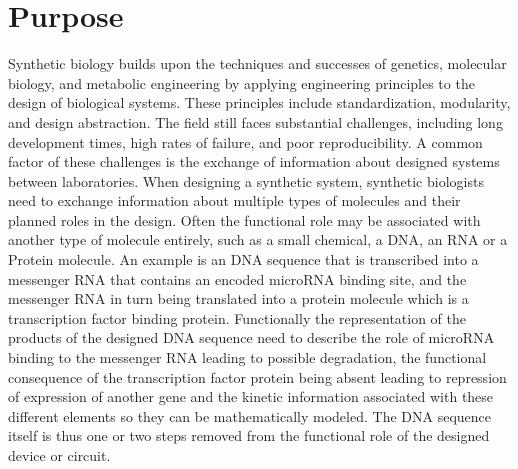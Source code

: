 \section{Purpose}



Synthetic biology builds upon the techniques and successes of genetics, molecular biology, and metabolic engineering by applying engineering principles to the design of biological systems. These principles include standardization, modularity, and design abstraction. The field still faces substantial challenges, including long development times, high rates of failure, and poor reproducibility. A common factor of these challenges is the exchange of information about designed systems between laboratories. When designing a synthetic system,  synthetic biologists need to exchange information about multiple types of molecules and their planned roles in the design. Often the functional role may be associated with another type of molecule entirely, such as a small chemical, a DNA, an RNA or a Protein molecule. An example is an DNA sequence that is transcribed into a messenger RNA that contains an encoded microRNA binding site, and the messenger RNA in turn being translated into a protein molecule which is a transcription factor binding protein. Functionally the representation of the products of the designed DNA sequence need to describe the role of microRNA binding to the messenger RNA leading to possible  degradation, the functional consequence of the transcription factor protein being absent leading to repression of expression of another gene and the kinetic information associated with these different elements so they can be mathematically modeled. The DNA sequence itself is thus one or two steps removed from the functional role of the designed device or circuit. 

